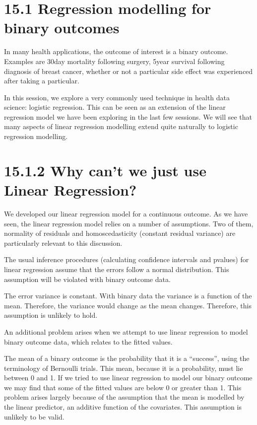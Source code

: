 \documentclass[letterpaper,10pt,english]{jupyterBook}
\begin{document}
\section{15.1 Regression modelling for binary outcomes}
\label{\detokenize{15.b. Logistic Regression:regression-modelling-for-binary-outcomes}}\label{\detokenize{15.b. Logistic Regression::doc}}
\sphinxAtStartPar
In many health applications, the outcome of interest is a binary outcome. Examples are 30\sphinxhyphen{}day mortality following surgery, 5\sphinxhyphen{}year survival following diagnosis of breast cancer, whether or not a particular side effect was experienced after taking a particular.

\sphinxAtStartPar
In this session, we explore a very commonly used technique in health data science: logistic regression. This can be seen as an extension of the linear regression model we have been exploring in the last few sessions. We will see that many aspects of linear regression modelling extend quite naturally to logistic regression modelling.


\section{15.1.2 Why can’t we just use Linear Regression?}
\label{\detokenize{15.b. Logistic Regression:why-cant-we-just-use-linear-regression}}
\sphinxAtStartPar
We developed our linear regression model for a continuous outcome. As we have seen, the linear regression model relies on a number of assumptions. Two of them, normality of residuals and homoscedasticity (constant residual variance) are particularly relevant to this discussion.

\sphinxAtStartPar
{} The usual inference procedures (calculating confidence intervals and p\sphinxhyphen{}values) for linear regression assume that the errors follow a normal distribution. This assumption will be violated with binary outcome data.

\sphinxAtStartPar
{} The error variance is constant. With binary data the variance is a function of the mean. Therefore, the variance would change as the mean changes. Therefore, this assumption is unlikely to hold.

\sphinxAtStartPar
An additional problem arises when we attempt to use linear regression to model binary outcome data, which relates to the fitted values.

\sphinxAtStartPar
{} The mean of a binary outcome is the probability that it is a “success”, using the terminology of Bernoulli trials. This mean, because it is a probability, must lie between 0 and 1. If we tried to use linear regression to model our binary outcome we may find that some of the fitted values are below 0 or greater than 1. This problem arises largely because of the assumption that the mean is modelled by the linear predictor, an additive function of the covariates. This assumption is unlikely to be valid.
\end{document}
